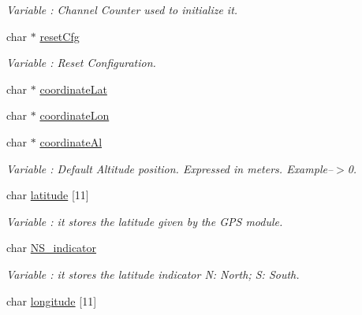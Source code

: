 \begin{DoxyCompactItemize}
\begin{DoxyCompactList}\small\item\em Variable \+: Channel Counter used to initialize it. \end{DoxyCompactList}\item 
char $\ast$ \hyperlink{class_wasp_g_p_s_a6e2bf5694bf9761c7a0397a85a332e78}{reset\+Cfg}\hypertarget{class_wasp_g_p_s_a6e2bf5694bf9761c7a0397a85a332e78}{}\label{class_wasp_g_p_s_a6e2bf5694bf9761c7a0397a85a332e78}

\begin{DoxyCompactList}\small\item\em Variable \+: Reset Configuration. \end{DoxyCompactList}\item 
char $\ast$ \hyperlink{class_wasp_g_p_s_aa854571fb2346b18cb4e919f5f0d2c39}{coordinate\+Lat}
\item 
char $\ast$ \hyperlink{class_wasp_g_p_s_afb52e5ef895f9a4b38f7df8720ae5834}{coordinate\+Lon}
\item 
char $\ast$ \hyperlink{class_wasp_g_p_s_ac5e0de3f3f4515fb4ca0ce8eff30a62b}{coordinate\+Al}\hypertarget{class_wasp_g_p_s_ac5e0de3f3f4515fb4ca0ce8eff30a62b}{}\label{class_wasp_g_p_s_ac5e0de3f3f4515fb4ca0ce8eff30a62b}

\begin{DoxyCompactList}\small\item\em Variable \+: Default Altitude position. Expressed in meters. Example--$>$0. \end{DoxyCompactList}\item 
char \hyperlink{class_wasp_g_p_s_ae5f4be8c4baf4bf37fe4da05e0441de5}{latitude} \mbox{[}11\mbox{]}\hypertarget{class_wasp_g_p_s_ae5f4be8c4baf4bf37fe4da05e0441de5}{}\label{class_wasp_g_p_s_ae5f4be8c4baf4bf37fe4da05e0441de5}

\begin{DoxyCompactList}\small\item\em Variable \+: it stores the latitude given by the G\+PS module. \end{DoxyCompactList}\item 
char \hyperlink{class_wasp_g_p_s_aab20497f7689102728afa42133906568}{N\+S\+\_\+indicator}\hypertarget{class_wasp_g_p_s_aab20497f7689102728afa42133906568}{}\label{class_wasp_g_p_s_aab20497f7689102728afa42133906568}

\begin{DoxyCompactList}\small\item\em Variable \+: it stores the latitude indicator N\+: North; S\+: South. \end{DoxyCompactList}\item 
char \hyperlink{class_wasp_g_p_s_a88d11e3966a3a80eb84b1f381700e7ab}{longitude} \mbox{[}11\mbox{]}\hypertarget{class_wasp_g_p_s_a88d11e3966a3a80eb84b1f381700e7ab}{}\label{class_wasp_g_p_s_a88d11e3966a3a80eb84b1f381700e7ab}


\end{DoxyCompactItemize}
